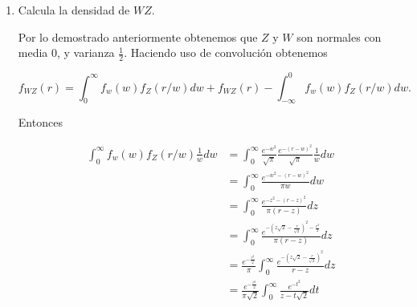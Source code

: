 \documentclass[letterpaper]{article}
\theoremstyle{definition}
\theoremstyle{lemathm}
\theoremstyle{lemademthm}
\begin{document}
\begin{enumerate}
\begin{enumerate}
\begin{proof}
				\[\int_{-\infty}^{\infty} e^{-t^2} dt = \sqrt{\pi}\]

				y concluimos que

				\[f_{X+Y}(z) = \frac{e^{-\frac{z^2}{4}}}{2\sqrt{\pi}}\]

				tiene distribución normal con varianza $2$ y media $0$.

				Ahora veamos que una variable aleatoria normal por una constante sigue siendo normal. Esto es pues recordemos que

				\[f_{A(B)} (t) = f_B(A^{-1}(t)) (A^{-1}(t))',\]

				entonces

				\[f_{cX}(z) = \frac{f_X\left(\frac{z}{c}\right)}{c} = \frac{e^{-\frac{x^2}{2c^2}}}{c\sqrt{2\pi}}\]

				la cual tiene distribución normal con varianza $c^2$ y media $0$.
				Por lo tanto concluimos que las combinaciones lineales de dos variables aleatorias normales estandar $aX + bY$ son normales con media $0$ y varianza $a^2 + b^2$. En específico $Z$ y $W$, con media $0$ y a varianza $s$ y $s$ respectivamente. Veamos lo siguiente

				\[Cov(Z,W) = \frac{Cov(X+Y,X-Y)}{4}=\]\[ \frac{Cov(X,X) - Cov(X,Y) + Cov(Y,X) - Cov(Y,Y)}{4} = \frac{V(X) - V(Y)}{4} = 0.\]

				Por lo que concluimos que $W$ y $Z$ son independientes.

			\end{proof}

			\newpage
			
			\item Calcula la densidad de $WZ$.
				
			Por lo demostrado anteriormente obtenemos que $Z$ y $W$ son normales con media $0$, y varianza $\frac{1}{2}$. Haciendo uso de convolución obtenemos

			\[f_{WZ}(r) = \int_{0}^{\infty} f_w(w)f_Z(r/w)dw + f_{WZ}(r) - \int_{-\infty}^{0} f_w(w)f_Z(r/w)dw.\]
			
			Entonces

			\begin{align*}
				\int_{0}^{\infty} f_w(w)f_Z(r/w)\frac{1}{w}dw &= \int_{0}^{\infty} \frac{e^{-w^2}}{\sqrt{\pi}} \frac{e^{-(r-w)^2}}{\sqrt{\pi}}\frac{1}{w}dw\\
				&= \int_{0}^{\infty} \frac{e^{-w^2-(r-w)^2}}{\pi w}dw\\
				&= \int_{0}^{\infty} \frac{e^{-z^2-(r-z)^2}}{\pi (r-z)}dz\\
				&= \int_{0}^{\infty} \frac{e^{-(z\sqrt{2}-\frac{r}{\sqrt{2}})^2-\frac{r^2}{2}}}{\pi(r-z)}dz\\
				&= \frac{e^{-\frac{r^2}{2}}}{\pi} \int_{0}^{\infty} \frac{e^{-(z\sqrt{2}-\frac{r}{\sqrt{2}})^2}}{r-z}dz\\
				&= \frac{e^{-\frac{r^2}{2}}}{\pi\sqrt{2}} \int_{0}^{\infty} \frac{e^{-t^2}}{z-t\sqrt{2}}dt
			\end{align*}


\end{enumerate}
\end{enumerate}
\end{document}
